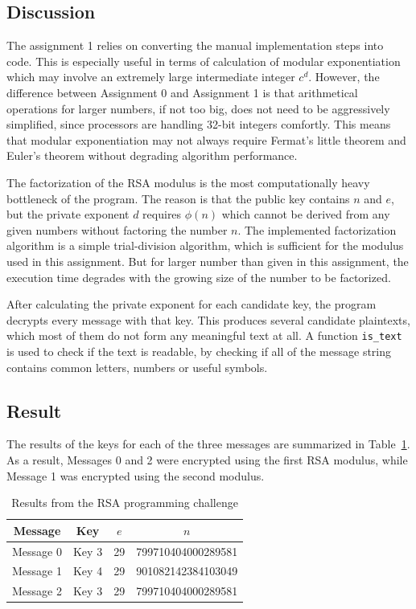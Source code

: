 \documentclass[11pt,a4paper]{article}
\begin{document}
\subsection*{Discussion}

The assignment 1 relies on converting the manual implementation steps into code. This is especially useful in terms of calculation of modular exponentiation which may involve an extremely large intermediate integer $c^d$. However, the difference between Assignment 0 and Assignment 1 is that arithmetical operations for larger numbers, if not too big, does not need to be aggressively simplified, since processors are handling 32-bit integers comfortly. This means that modular exponentiation may not always require Fermat's little theorem and Euler's theorem without degrading algorithm performance.

The factorization of the RSA modulus is the most computationally heavy bottleneck of the program. The reason is that the public key contains $n$ and $e$, but the private exponent $d$ requires $\phi(n)$ which cannot be derived from any given numbers without factoring the number $n$. The implemented factorization algorithm is a simple trial-division algorithm, which is sufficient for the modulus used in this assignment. But for larger number than given in this assignment, the execution time degrades with the growing size of the number to be factorized.

After calculating the private exponent for each candidate key, the program decrypts every message with that key. This produces several candidate plaintexts, which most of them do not form any meaningful text at all. A function \texttt{is\_text} is used to check if the text is readable, by checking if all of the message string contains common letters, numbers or useful symbols. 

\subsection*{Result}

The results of the keys for each of the three messages are summarized in Table~\ref{tab:assignment1-results}. As a result, Messages 0 and 2 were encrypted using the first RSA modulus, while Message 1 was encrypted using the second modulus.

\begin{table}[H]
\centering
\caption{Results from the RSA programming challenge}
\label{tab:assignment1-results}
\begin{tabular}{@{}c c c c@{}}
\toprule
\textbf{Message} & \textbf{Key} & \textbf{$e$} & \textbf{$n$} \\
\midrule
Message 0 & Key 3 & 29 & 799710404000289581 \\
Message 1 & Key 4 & 29 & 901082142384103049 \\
Message 2 & Key 3 & 29 & 799710404000289581 \\
\bottomrule
\end{tabular}
\end{table}
\end{document}
